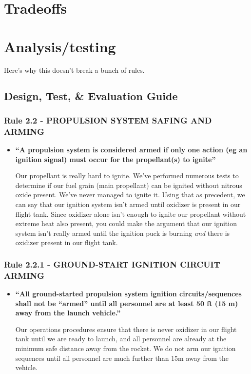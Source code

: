 \documentclass[letter]{article}
\begin{document}

\section{Tradeoffs}

\section{Analysis/testing}
Here's why this doesn't break a bunch of rules.

\subsection{Design, Test, \& Evaluation Guide}
\subsubsection{Rule 2.2 - PROPULSION SYSTEM SAFING AND ARMING}
\begin{itemize}
\item {\bfseries ``A propulsion system is considered armed if only one action 
(eg an ignition signal) must occur for the propellant(s) to ignite''}

Our propellant is really hard to ignite. We've performed numerous tests to determine
if our fuel grain (main propellant) can be ignited without nitrous oxide present.
We've never managed to ignite it. Using that as precedent, we can say
that our ignition system isn't armed until oxidizer is present in our flight tank.
Since oxidizer alone isn't enough to ignite our propellant without extreme heat also
present, you could make the argument that our ignition system isn't really armed until
the ignition puck is burning \textit{and} there is oxidizer present in our flight tank.
\end{itemize}
\subsubsection{Rule 2.2.1 - GROUND-START IGNITION CIRCUIT ARMING}
\begin{itemize}
\item {\bfseries ``All ground-started propulsion system ignition circuits/sequences shall not be ``armed'' until all personnel are at least
50 ft (15 m) away from the launch vehicle.''}

Our operations procedures ensure that there is never oxidizer in our flight tank
until we are ready to launch, and all personnel are already at the minimum safe
distance away from the rocket. We do not arm our ignition sequences until all
personnel are much further than 15m away from the vehicle.
\end{itemize}
\end{document}
